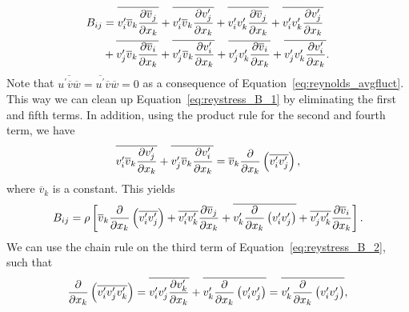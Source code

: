 \begin{equation}
	\begin{aligned}
	B_{ij} &=
	\overline{v_i^\prime\overline v_k \frac{\partial\overline v_j^{\vphantom{\prime}}}{\partial x_k} }
	+ \overline{v_i^\prime\overline v_k \frac{\partial v_j^\prime}{\partial x_k} }
	+ \overline{v_i^\prime v_k^\prime \frac{\partial\overline v_j^{\vphantom{\prime}}}{\partial x_k} }
	+ \overline{v_i^\prime v_k^\prime \frac{\partial v_j^\prime}{\partial x_k} } \\
	&+ \overline{v_j^\prime\overline v_k \frac{\partial\overline v_i}{\partial x_k} }
	+ \overline{v_j^\prime\overline v_k \frac{\partial v_i^\prime}{\partial x_k} }
	+ \overline{v_j^\prime v_k^\prime \frac{\partial\overline v_i}{\partial x_k} }
	+ \overline{v_j^\prime v_k^\prime \frac{\partial v_i^\prime}{\partial x_k} }.
	\end{aligned}
	\label{eq:reystress_B_1}
\end{equation}
Note that $\overline{u^\prime \overline v \overline w} = \overline{u^\prime} \overline v \overline w = 0$ as a consequence of Equation~\ref{eq:reynolds_avgfluct}. This way we can clean up Equation~\ref{eq:reystress_B_1} by eliminating the first and fifth terms. In addition, using the product rule for the second and fourth term, we have
\begin{equation}
	\overline{v_i^\prime \overline v_k \frac{\partial v_j^\prime}{\partial x_k} }
	+ \overline{v_j^\prime \overline v_k \frac{\partial v_{i\vphantom{j}}^\prime}{\partial x_k} } 
	= \overline v_k \frac{\partial}{\partial x_k} \left(\overline{v_i^\prime v_j^\prime}\right),
\end{equation}
where $\overline v_k$ is a constant. This yields
\begin{equation}
	B_{ij} = \rho \left[\overline v_k \frac{\partial}{\partial x_k} \left(\overline{v_i^\prime v_j^\prime}\right) 
	+ \overline{v_i^\prime v_k^\prime} \frac{\partial\overline v_j}{\partial x_k}
	+ \overline{v_k^\prime \frac{\partial}{\partial x_k} \left(v_i^\prime v_j^\prime\right)}
	+ \overline{v_j^\prime v_k^\prime}\frac{\partial\overline v_{i\vphantom{j}}}{\partial x_k}\right].
	\label{eq:reystress_B_2}
\end{equation}
We can use the chain rule on the third term of Equation~\ref{eq:reystress_B_2}, such that
\begin{equation}
	\frac{\partial}{\partial x_k} \left(\overline{v_i^\prime v_j^\prime v_k^\prime }\right) 
	= \overline{v_i^\prime v_j^\prime \frac{\partial v_k^\prime}{\partial x_k} } 
	+ \overline{v_k^\prime \frac{\partial\vphantom{v_k^\prime}}{\partial x_k}\left(v_i^\prime v_j^\prime\right)} 
	= \overline{v_k^\prime \frac{\partial\vphantom{v_k^\prime}}{\partial x_k}\left(v_i^\prime v_j^\prime\right)},
\end{equation}
